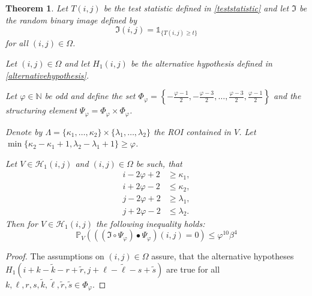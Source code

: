 \documentclass[a4paper,12pt]{article}
\theoremstyle{plain}
\newtheorem{theorem}{Theorem}[section]
\theoremstyle{definition}
\numberwithin{equation}{section}
\begin{document}
\begin{appendix}
\begin{theorem}
		Let $T(i, j)$ be the test statistic defined in \eqref{teststatistic} and let $\mathfrak{I}$ be the random binary image defined by
		\begin{equation*}
			\mathfrak{I}(i, j) = \mathds{1}_{ \{ T(i, j) \geq t \} }
		\end{equation*}
		for all $(i, j) \in \Omega$.
		
		Let $(i, j) \in \Omega$ and let $H_1(i, j)$ be the alternative hypothesis defined in \eqref{alternativehypothesis}.
		
		Let $\varphi \in \mathbb{N}$ be odd and define the set $\Phi_\varphi = \left\{ -\frac{\varphi - 1}{2}, -\frac{\varphi - 3}{2}, \dots, \frac{\varphi - 3}{2}, \frac{\varphi - 1}{2} \right\}$ and the structuring element $\Psi_\varphi = \Phi_\varphi \times \Phi_\varphi$.
		
		Denote by $\varLambda = \{ \kappa_1, \dots, \kappa_2 \} \times \{ \lambda_1, \dots, \lambda_2 \}$ the ROI contained in $V$. Let $\min \{ \kappa_2 - \kappa_1 + 1, \lambda_2 - \lambda_1 + 1 \} \geq \varphi$.
		
		Let $V \in \mathcal{H}_1(i, j)$ and $(i, j) \in \Omega$ be such, that
		\begin{equation}
			\begin{aligned}
				i - 2 \varphi + 2 &\geq \kappa_1, \\
				i + 2 \varphi - 2 &\leq \kappa_2, \\
				j - 2 \varphi + 2 &\geq \lambda_1, \\
				j + 2 \varphi - 2 &\leq \lambda_2.
			\end{aligned}
		\end{equation}
		Then for $V \in \mathcal{H}_1(i, j)$ the following inequality holds:
		\begin{equation}
			\mathbb{P}_V\left( ((\mathfrak{I} \circ \Psi_\varphi) \bullet \Psi_\varphi)(i, j) = 0 \right) \leq \varphi^{10} \beta^4
		\end{equation}
	\end{theorem}
	\begin{proof}
		The assumptions on $(i, j) \in \Omega$ assure, that the alternative hypotheses $H_1(i + k - \tilde{k} - r + \tilde{r}, j + \ell - \tilde{\ell} - s + \tilde{s})$ are true for all $k, \ell, r, s, \tilde{k}, \tilde{\ell}, \tilde{r}, \tilde{s} \in \Phi_\varphi$.
		

\end{proof}
\end{appendix}
\end{document}
